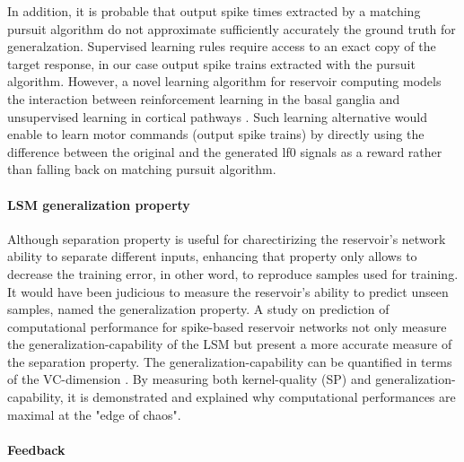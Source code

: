 \documentclass[11pt, a4paper]{article} %
\begin{document}
In addition, it is probable that output spike times extracted by a matching pursuit algorithm do not approximate sufficiently accurately the ground truth for generalzation. Supervised learning rules require access to an exact copy of the target response, in our case output spike trains extracted with the pursuit algorithm. However, a novel learning algorithm for reservoir computing models the interaction between reinforcement learning in the basal ganglia and unsupervised learning in cortical pathways \cite{pyle2018model}. Such learning alternative would enable to learn motor commands (output spike trains) by directly using the difference between the original and the generated lf0 signals as a reward rather than falling back on matching pursuit algorithm.

\paragraph{LSM generalization property}

Although separation property is useful for charectirizing the reservoir's network ability to separate different inputs, enhancing that property only allows to decrease the training error, in other word, to reproduce samples used for training. It would have been judicious to measure the reservoir's ability to predict unseen samples, named the generalization property. A study on prediction of computational performance for spike-based reservoir networks \cite{legenstein2007edge} not only measure the generalization-capability of the LSM but present a more accurate measure of the separation property. The generalization-capability can be quantified in terms of the VC-dimension \cite{vapnikn}. By measuring both kernel-quality (SP) and generalization-capability, it is demonstrated and explained why computational performances are maximal  at the "edge of chaos".

\paragraph{Feedback}
\end{document}
